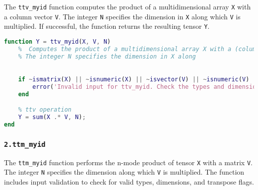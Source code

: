 The \texttt{ttv\_myid} function computes the product of a multidimensional array \texttt{X} with a column vector \texttt{V}. The integer \texttt{N} specifies the dimension in \texttt{X} along which \texttt{V} is multiplied. If successful, the function returns the resulting tensor \texttt{Y}.
\begin{center}
     \begin{lstlisting}[language=MATLAB, caption= Tensor of a column vector]
     function Y = ttv_myid(X, V, N)
    %  Computes the product of a multidimensional array X with a (column) vector V.
    % The integer N specifies the dimension in X along 

   
    if ~ismatrix(X) || ~isnumeric(X) || ~isvector(V) || ~isnumeric(V) || ~isscalar(N) || ~isnumeric(N) || N <= 0 || N > ndims(X) || size(V, 1) ~= size(X, N)
        error('Invalid input for ttv_myid. Check the types and dimensions of the input variables.');
    end

    % ttv operation
    Y = sum(X .* V, N);
end

     \end{lstlisting}
\end{center}


\subsubsection*{\texttt{2.ttm\_myid}}

The \texttt{ttm\_myid} function performs the n-mode product of tensor \texttt{X} with a matrix \texttt{V}. The integer \texttt{N} specifies the dimension along which \texttt{V} is multiplied. The function includes input validation to check for valid types, dimensions, and transpose flags.

